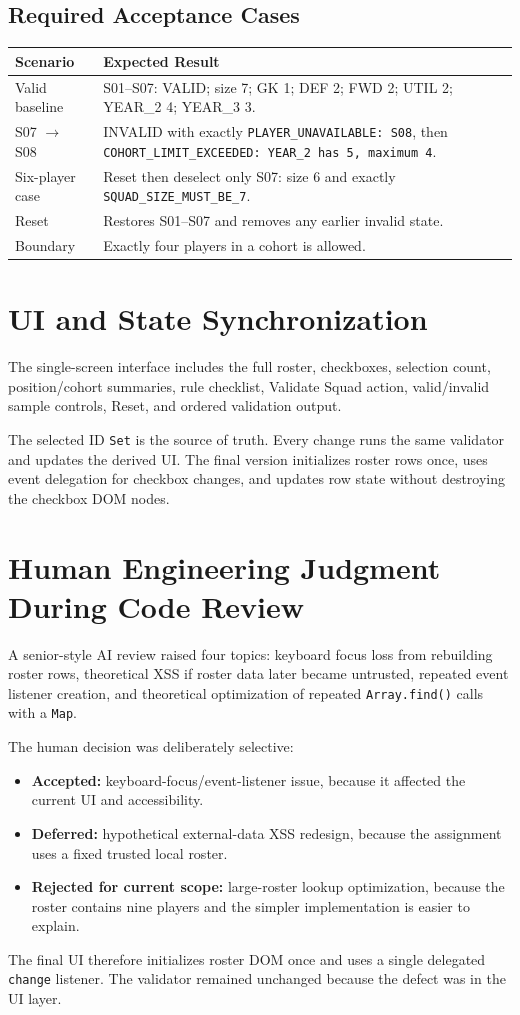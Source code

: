 \documentclass[11pt,a4paper]{article}
\begin{document}
\subsection{Required Acceptance Cases}
\begin{longtable}{p{}p{}}
\toprule
\textbf{Scenario} & \textbf{Expected Result} \\
\midrule
Valid baseline & S01--S07: VALID; size 7; GK 1; DEF 2; FWD 2; UTIL 2; YEAR\_2 4; YEAR\_3 3. \\
S07 $\rightarrow$ S08 & INVALID with exactly \texttt{PLAYER\_UNAVAILABLE: S08}, then \texttt{COHORT\_LIMIT\_EXCEEDED: YEAR\_2 has 5, maximum 4}. \\
Six-player case & Reset then deselect only S07: size 6 and exactly \texttt{SQUAD\_SIZE\_MUST\_BE\_7}. \\
Reset & Restores S01--S07 and removes any earlier invalid state. \\
Boundary & Exactly four players in a cohort is allowed. \\
\bottomrule
\end{longtable}

\section{UI and State Synchronization}
The single-screen interface includes the full roster, checkboxes, selection count, position/cohort summaries, rule checklist, Validate Squad action, valid/invalid sample controls, Reset, and ordered validation output.

The selected ID \texttt{Set} is the source of truth. Every change runs the same validator and updates the derived UI. The final version initializes roster rows once, uses event delegation for checkbox changes, and updates row state without destroying the checkbox DOM nodes.

\section{Human Engineering Judgment During Code Review}
A senior-style AI review raised four topics: keyboard focus loss from rebuilding roster rows, theoretical XSS if roster data later became untrusted, repeated event listener creation, and theoretical optimization of repeated \texttt{Array.find()} calls with a \texttt{Map}.

The human decision was deliberately selective:
\begin{itemize}
\item \textbf{Accepted:} keyboard-focus/event-listener issue, because it affected the current UI and accessibility.
\item \textbf{Deferred:} hypothetical external-data XSS redesign, because the assignment uses a fixed trusted local roster.
\item \textbf{Rejected for current scope:} large-roster lookup optimization, because the roster contains nine players and the simpler implementation is easier to explain.
\end{itemize}
The final UI therefore initializes roster DOM once and uses a single delegated \texttt{change} listener. The validator remained unchanged because the defect was in the UI layer.
\end{document}
